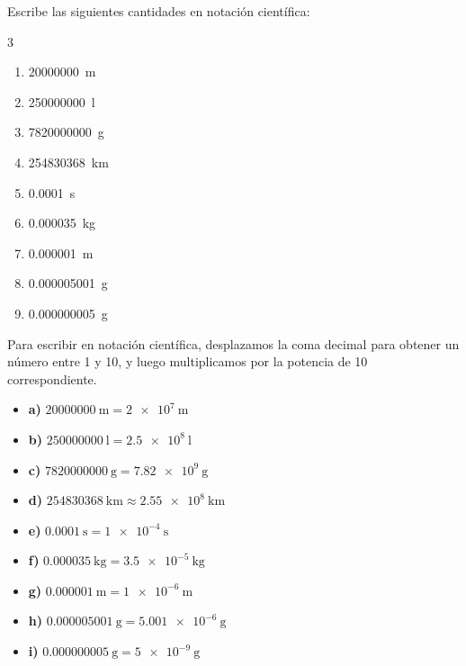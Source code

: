 \begin{exercise}
    Escribe las siguientes cantidades en notación científica:
    \begin{multicols}{3}
        \begin{enumerate}[label=\letraminuscula]
\item \qty{20000000}{\m}
\item \qty{250000000}{\litre}
\item \qty{7820000000}{\g}
\item \qty{254830368}{\km}
\item \qty{0.0001}{\s}
\item \qty{0.000035}{\kilo\g}
\item \qty{0.000001}{\m}
\item \qty{0.000005001}{\g}
\item \qty{0.000000005}{\g}
        \end{enumerate}
    \end{multicols}

    \begin{solu}
        Para escribir en notación científica, desplazamos la coma decimal para obtener un número entre 1 y 10, y luego multiplicamos por la potencia de 10 correspondiente.
        \begin{itemize}
            \item \textbf{a)} \( \qty{20000000}{\m} = \qty{2e7}{\m} \)
            \item \textbf{b)} \( \qty{250000000}{\litre} = \qty{2.5e8}{\litre} \)
            \item \textbf{c)} \( \qty{7820000000}{\g} = \qty{7.82e9}{\g} \)
            \item \textbf{d)} \( \qty{254830368}{\km} \approx \qty{2.55e8}{\km} \)
            \item \textbf{e)} \( \qty{0.0001}{\s} = \qty{1e-4}{\s} \)
            \item \textbf{f)} \( \qty{0.000035}{\kg} = \qty{3.5e-5}{\kg} \)
            \item \textbf{g)} \( \qty{0.000001}{\m} = \qty{1e-6}{\m} \)
            \item \textbf{h)} \( \qty{0.000005001}{\g} = \qty{5.001e-6}{\g} \)
            \item \textbf{i)} \( \qty{0.000000005}{\g} = \qty{5e-9}{\g} \)
        \end{itemize}
    \end{solu}

\end{exercise}
